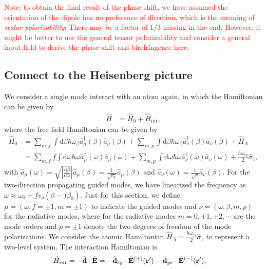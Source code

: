 \documentclass[preprint,aps,pra,onecolumn]{revtex4-1} %
\begin{document}
\textcolor{red}{Note: to obtain the final result of the phase shift, we have assumed the orientation of the dipole has no preference of direction, which is the meaning of \textit{scalar polarizability}. There may be a factor of $1/3$ missing in the end. However, it might be better to use the general tensor polarizability and consider a general input field to derive the phase shift and birefringence here. }

\subsection{Connect to the Heisenberg picture}
We consider a single mode interact with an atom again, in which the Hamiltonian can be given by
\begin{align}
\hat{H} &= \hat{H}_0 + \hat{H}_{int}, 
\end{align}
where the free field Hamiltonian can be given by
\begin{align}
\hat{H}_0 &= \sum_{m,f} \int \mathrm{d}\beta \hbar \omega_{\beta} \hat{a}^\dagger_\mu(\beta)\hat{a}_\mu (\beta) +\sum_{m,p} \int \mathrm{d}\beta \hbar \omega_{\beta} \hat{a}^\dagger_\nu(\beta)\hat{a}_\nu (\beta)+ \hat{H}_A \\
&= \sum_{m,f} f\int \mathrm{d}\omega \hbar \omega \hat{a}^\dagger_\mu(\omega)\hat{a}_\mu (\omega) +\sum_{m,p} \int \mathrm{d}\omega \hbar \omega \hat{a}^\dagger_\nu(\omega)\hat{a}_\nu (\omega)+ \frac{\hbar\omega_{eg}}{2}\hat{\sigma}_z,
\end{align}
with $\hat{a}_\mu (\omega)= \sqrt{\left| \frac{\mathrm{d}\beta}{\mathrm{d}\omega}\right| }\hat{a}_\mu (\beta)=\frac{1}{\sqrt{v_g}}\hat{a}_\mu (\beta)$ and $\hat{a}_\nu (\omega)=  \frac{1}{\sqrt{c}}\hat{a}_\nu (\beta)$. For the two-direction propagating guided modes, we have linearized the frequency as $\omega\approx \omega_0+fv_g(\beta-f\beta_0)$. Just for this section, we define $\mu=(\omega,f=\pm 1,m=\pm 1)$ to indicate the guided modes and $\nu=(\omega,\beta,m,p)$ for the radiative modes, where for the radiative modes $m=0,\pm 1,\pm 2,\cdots$ are the mode orders and $p=\pm 1$ denote the two degrees of freedom of the mode polarizations.  We consider the atomic Hamiltonian $\hat{H}_A = \frac{\hbar\omega_{eg}}{2}\hat{\sigma}_z$ to represent a two-level system. The interaction Hamiltonian is
\begin{align}
\hat{H}_{int} &= -\hat{\mathbf{d}}\cdot \hat{\mathbf{E}}=-\hat{\mathbf{d}}_{eg}\cdot \hat{\mathbf{E}}^{(+)}(\mathbf{r}')-\hat{\mathbf{d}}_{ge}\cdot \hat{\mathbf{E}}^{(-)}(\mathbf{r}'),
\end{align}
\end{document}
